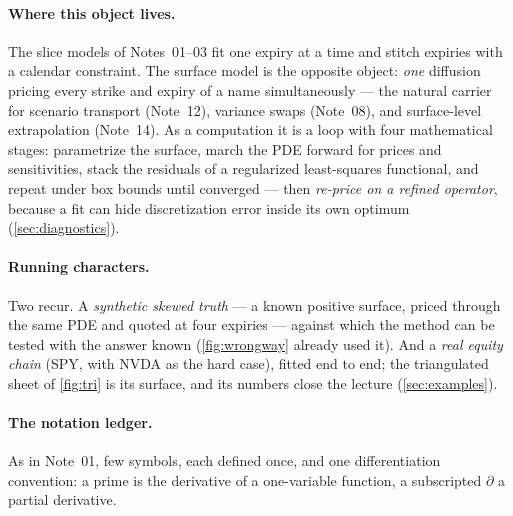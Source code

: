 \documentclass[11pt]{article}
\begin{document}
\paragraph{Where this object lives.}  The slice models of Notes~01--03 fit
one expiry at a time and stitch expiries with a calendar constraint.  The
surface model is the opposite object: \emph{one} diffusion pricing every
strike and expiry of a name simultaneously --- the natural carrier for
scenario transport (Note~12), variance swaps (Note~08), and surface-level
extrapolation (Note~14).  As a computation it is a loop with four
mathematical stages: parametrize the surface, march the PDE forward for
prices and sensitivities, stack the residuals of a regularized
least-squares functional, and repeat under box bounds until converged ---
then \emph{re-price on a refined operator}, because a fit can hide
discretization error inside its own optimum (\cref{sec:diagnostics}).

\paragraph{Running characters.}  Two recur.  A \emph{synthetic skewed
truth} --- a known positive surface, priced through the same PDE and
quoted at four expiries --- against which the method can be tested with the
answer known (\cref{fig:wrongway} already used it).  And a \emph{real
equity chain} (SPY, with NVDA as the hard case), fitted end to end; the
triangulated sheet of \cref{fig:tri} is its surface, and its numbers close
the lecture (\cref{sec:examples}).

\paragraph{The notation ledger.}  As in Note~01, few symbols, each defined
once, and one differentiation convention: a prime is the derivative of a
one-variable function, a subscripted $\partial$ a partial derivative.
\end{document}
